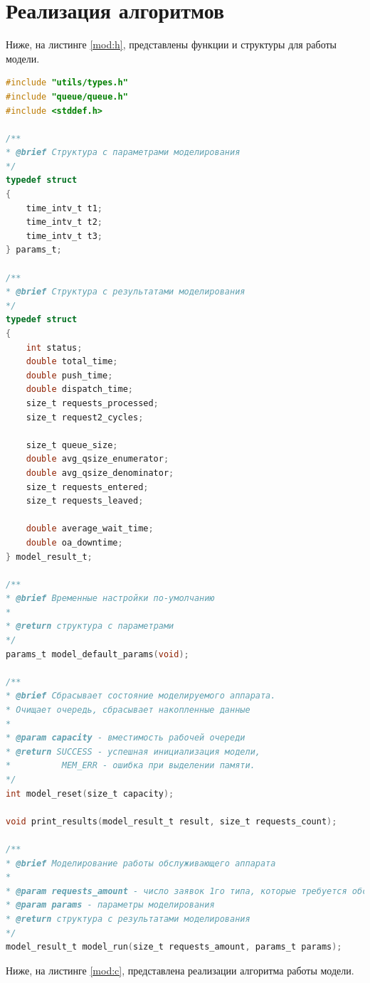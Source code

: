 \section{Реализация алгоритмов}

Ниже, на листинге \ref{mod:h}, представлены функции и структуры для работы модели.

\begin{lstlisting}[language=C,caption=Структуры и функции для моделирования,label=mod:h]
#include "utils/types.h"
#include "queue/queue.h"
#include <stddef.h>

/**
* @brief Структура с параметрами моделирования
*/
typedef struct
{
	time_intv_t t1;
	time_intv_t t2;
	time_intv_t t3;
} params_t;

/**
* @brief Структура с результатами моделирования
*/
typedef struct
{
	int status;
	double total_time;
	double push_time;
	double dispatch_time;
	size_t requests_processed;
	size_t request2_cycles;
	
	size_t queue_size;
	double avg_qsize_enumerator;
	double avg_qsize_denominator;
	size_t requests_entered;
	size_t requests_leaved;
	
	double average_wait_time;
	double oa_downtime;
} model_result_t;

/**
* @brief Временные настройки по-умолчанию
* 
* @return структура с параметрами
*/
params_t model_default_params(void);

/**
* @brief Сбрасывает состояние моделируемого аппарата.
* Очищает очередь, сбрасывает накопленные данные
*
* @param capacity - вместимость рабочей очереди
* @return SUCCESS - успешная инициализация модели,
*          MEM_ERR - ошибка при выделении памяти.
*/
int model_reset(size_t capacity);

void print_results(model_result_t result, size_t requests_count);

/**
* @brief Моделирование работы обслуживающего аппарата
*
* @param requests_amount - число заявок 1го типа, которые требуется обслужить
* @param params - параметры моделирования
* @return структура с результатами моделирования
*/
model_result_t model_run(size_t requests_amount, params_t params);
\end{lstlisting}

Ниже, на листинге \ref{mod:c}, представлена реализации алгоритма работы модели.

